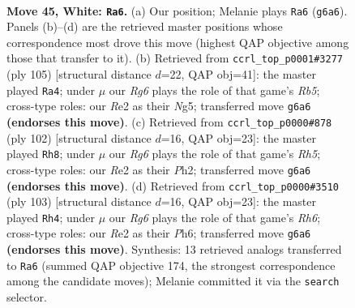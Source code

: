 \documentclass[11pt]{article}
\begin{document}
\clearpage

\begin{figure}[p]\centering
\begin{subfigure}{0.46\textwidth}\centering
\resizebox{\linewidth}{!}{%
\newchessgame
\chessboard[
  setfen={6k1/1r4b1/6R1/8/2P4K/4N3/4R3/8 w - - 10 45},
  showmover=false,
  pgfstyle=straightmove, color=movearrow, markmove={g6-a6}
]}
\caption{}
\end{subfigure}\hfill
\begin{subfigure}{0.46\textwidth}\centering
\resizebox{\linewidth}{!}{%
\newchessgame
\chessboard[
  setfen={8/4k3/8/6n1/1rB4R/6P1/4K3/8 b - - 4 53},
  showmover=false,
  pgfstyle=straightmove, color=movearrow, markmove={b4-a4}
]}
\caption{}
\end{subfigure}
\\[4pt]
\begin{subfigure}{0.46\textwidth}\centering
\resizebox{\linewidth}{!}{%
\newchessgame
\chessboard[
  setfen={8/8/8/4kb1R/1r6/5K2/7P/8 w - - 14 52},
  showmover=false,
  pgfstyle=straightmove, color=movearrow, markmove={h5-h8}
]}
\caption{}
\end{subfigure}\hfill
\begin{subfigure}{0.46\textwidth}\centering
\resizebox{\linewidth}{!}{%
\newchessgame
\chessboard[
  setfen={8/p7/5k1p/8/8/R3KB1r/8/8 b - - 5 52},
  showmover=false,
  pgfstyle=straightmove, color=movearrow, markmove={h3-h4}
]}
\caption{}
\end{subfigure}
\caption{\textbf{Move 45, White: \texttt{Ra6}.} (a) Our position; Melanie plays \texttt{Ra6} (\texttt{g6a6}). Panels (b)--(d) are the retrieved master positions whose correspondence most drove this move (highest QAP objective among those that transfer to it). (b) Retrieved from \texttt{ccrl\_top\_p0001\#3277} (ply 105) [structural distance $d$=22, QAP obj=41]: the master played \texttt{Ra4}; under $\mu$ our \emph{Rg6} plays the role of that game's \emph{Rb5}; cross-type roles: our \emph{R}e2 as their \emph{N}g5; transferred move \texttt{g6a6} \textbf{(endorses this move)}. (c) Retrieved from \texttt{ccrl\_top\_p0000\#878} (ply 102) [structural distance $d$=16, QAP obj=23]: the master played \texttt{Rh8}; under $\mu$ our \emph{Rg6} plays the role of that game's \emph{Rh5}; cross-type roles: our \emph{R}e2 as their \emph{P}h2; transferred move \texttt{g6a6} \textbf{(endorses this move)}. (d) Retrieved from \texttt{ccrl\_top\_p0000\#3510} (ply 103) [structural distance $d$=16, QAP obj=23]: the master played \texttt{Rh4}; under $\mu$ our \emph{Rg6} plays the role of that game's \emph{Rh6}; cross-type roles: our \emph{R}e2 as their \emph{P}h6; transferred move \texttt{g6a6} \textbf{(endorses this move)}. Synthesis: 13 retrieved analogs transferred to \texttt{Ra6} (summed QAP objective 174, the strongest correspondence among the candidate moves); Melanie committed it via the \texttt{search} selector.}
\label{fig:thought-m88}
\end{figure}
\end{document}

